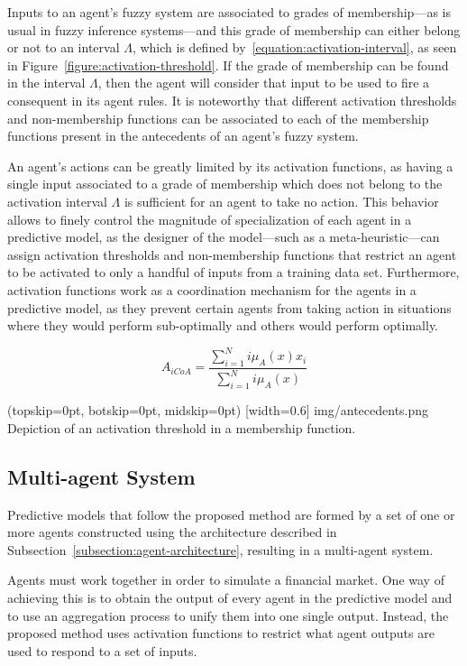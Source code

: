 \documentclass{ieeeaccess}
\begin{document}
Inputs to an agent's fuzzy system are associated to grades of membership---as
is usual in fuzzy inference systems---and this grade of membership can either
belong or not to an interval $\Lambda$, which is defined by~\ref{equation:activation-interval}, as seen in
Figure~\ref{figure:activation-threshold}. If the grade of membership can be
found in the interval $\Lambda$, then the agent will consider that input to be
used to fire a consequent in its agent rules. It is noteworthy that different
activation thresholds and non-membership functions can be associated to each of
the membership functions present in the antecedents of an agent's fuzzy system.

An agent's actions can be greatly limited by its activation functions, as having
a single input associated to a grade of membership which does not belong to the
activation interval $\Lambda$ is sufficient for an agent to take no action. This
behavior allows to finely control the magnitude of specialization of each agent
in a predictive model, as the designer of the model---such as a
meta-heuristic---can assign activation thresholds and non-membership functions
that restrict an agent to be activated to only a handful of inputs from a
training data set. Furthermore, activation functions work as a coordination
mechanism for the agents in a predictive model, as they prevent certain agents
from taking action in situations where they would perform sub-optimally and
others would perform optimally.

\begin{equation}
  \label{equation:activation-interval}
  A_{iCoA} = \dfrac{\sum_{i=1}^{N} i\mu_{A}(x) x_{i}}{\sum_{i=1}^{N}
    i\mu_{A}(x)}
\end{equation}

\Figure[](topskip=0pt, botskip=0pt, midskip=0pt)
[width=0.6\linewidth]
{img/antecedents.png}
{Depiction of an activation threshold in a membership function.
  \label{figure:activation-threshold}}

\subsection{Multi-agent System}
\label{subsection:mult-agent-system}

Predictive models that follow the proposed method are formed by a set
of one or more agents constructed using the architecture described in
Subsection~\ref{subsection:agent-architecture}, resulting in a multi-agent
system.

Agents must work together in order to simulate a financial market. One
way of achieving this is to obtain the output of every agent in the
predictive model and to use an aggregation process to unify them into
one single output. Instead, the proposed method uses activation
functions to restrict what agent outputs are used to respond to a set
of inputs.
\end{document}
